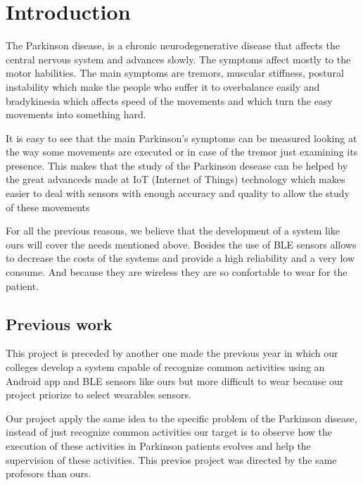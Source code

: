 \documentclass[11pt,spanish]{article}
\begin{document}
\newpage

\section{Introduction}

The Parkinson disease, is a chronic neurodegenerative disease that affects the central nervous system and advances slowly. The symptoms affect mostly to the motor habilities. The main symptoms are tremors, muscular stiffness, postural instability which make the people who suffer it to overbalance easily and bradykinesia which affects speed of the movements and which turn the easy movements into something hard.
\newline

It is easy to see that the main Parkinson's symptoms can be measured looking at the way some movements are executed or in case of the tremor just examining its presence. This makes that the study of the Parkinson desease can be helped by the great advanceds made at IoT (Internet of Things) technology which makes easier to deal with sensors with enough accuracy and quality to allow the study of these movements
\newline

For all the previous reasons, we believe that the development of a system like ours will cover the needs mentioned above. Besides the use of BLE sensors allows to decrease the costs of the systems and provide a high reliability and a very low consume. And because they are wireless they are so confortable to wear for the patient.
\newline

\subsection{Previous work}

This project is preceded by another one made the previous year \cite{TFG_Anterior} in which our colleges develop a system capable of recognize common activities using an Android app and BLE sensors like ours but more difficult to wear because our project priorize to select wearables sensors.
\newline

Our project apply the same idea to the specific problem of the Parkinson disease, instead of just recognize common activities our target is to observe how the execution of these activities in Parkinson patients evolves and help the supervision of these activities. This previos project was directed by the same profesors than ours.
\newline
\end{document}

